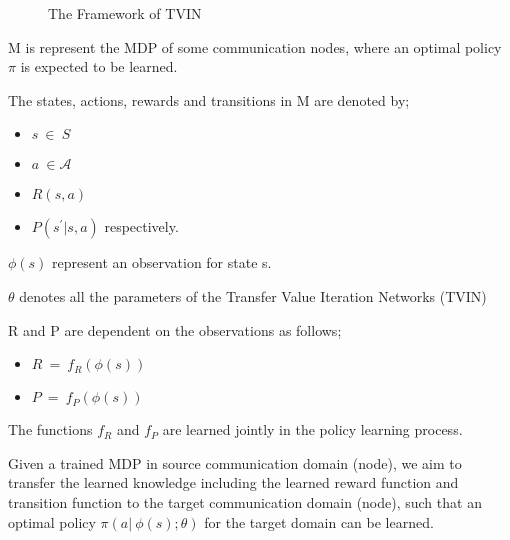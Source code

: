 \documentclass[letterpaper%
, oneside%
, 12pt%
,thesepararticles%
, english%
,creativecommons,hyperref, withAlgo2e%
]{thETS}
\begin{document}
\begin{figure}
\caption{The Framework of TVIN}
\end{figure}

M is represent the MDP of some communication nodes, where an optimal policy $\displaystyle \pi $ is expected to be learned.

The states, actions, rewards and transitions in M are denoted by;
\begin{itemize}
\item $\displaystyle s\ \in \mathcal{\ } S$
\item $\displaystyle a\ \in \mathcal{A}$
\item $\displaystyle R( s,a)$
\item $\displaystyle P\left( s^{'} |s,a\right)$ respectively.
\end{itemize}

$\displaystyle \phi ( s)$ represent an observation for state s.

$\displaystyle \theta $ denotes all the parameters of the Transfer Value Iteration Networks (TVIN)

R and P are dependent on the observations as follows; 
\begin{itemize}
\item $\displaystyle R\ =\ f_{R}( \phi ( s))$
\item $\displaystyle P\ =\ f_{P}( \phi ( s))$
\end{itemize}

The functions $\displaystyle f_{R}$ and $\displaystyle f_{P}$ are learned jointly in the policy learning process.

Given a trained MDP in source communication domain (node), we aim to transfer the learned knowledge including the learned reward function and transition function to the target communication domain (node), such that an optimal policy $\displaystyle \pi ( a|\ \phi ( s) ;\theta )$ for the target domain can be learned. 
\end{document}
